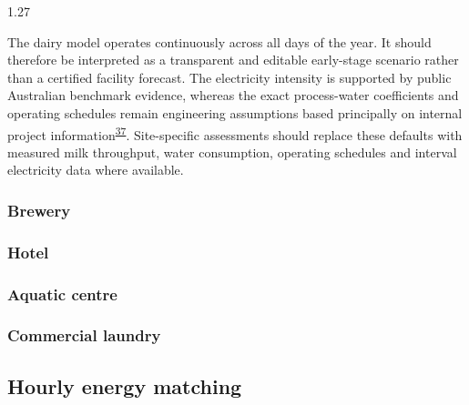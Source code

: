 \documentclass[12pt,letterpaper]{article}
\newcommand{\done}{\ \textcolor{green!45!black}{$\checkmark$}} %
\DeclareRobustCommand{\citenum}[1]{\hyperlink{ref:#1}{#1}} %
\begin{document}
\begin{spacing}{1.27}
\vspace{0.15in}

The dairy model operates continuously across all days of the year. It should therefore be interpreted as a transparent and editable early-stage scenario rather than a certified facility forecast. The electricity intensity is supported by public Australian benchmark evidence, whereas the exact process-water coefficients and operating schedules remain engineering assumptions based principally on internal project information\textsuperscript{\citenum{37}}. Site-specific assessments should replace these defaults with measured milk throughput, water consumption, operating schedules and interval electricity data where available.\par
\end{spacing}

\subsubsection{Brewery}\label{sec26}

\subsubsection{Hotel}\label{sec27}

\subsubsection{Aquatic centre}\label{sec28}

\subsubsection{Commercial laundry}\label{sec29}

\subsection[Hourly energy matching\done]{Hourly energy matching}\label{sec30}
\end{document}

